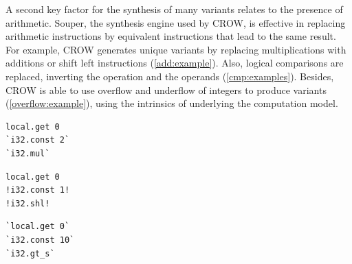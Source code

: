 A second key factor for the synthesis of many variants relates to the presence of arithmetic. Souper, the synthesis engine used by CROW, is effective in replacing  arithmetic instructions by equivalent instructions that lead to the same result. For example, CROW generates unique variants by replacing multiplications with additions or shift left instructions (\autoref{add:example}). Also, logical comparisons are replaced, inverting the operation and the operands (\autoref{cmp:examples}). Besides, CROW is able to use overflow and underflow of integers to produce variants (\autoref{overflow:example}), using the intrinsics of underlying the computation model.

{
\begin{code}
    \footnotesize

    \lstset{
        language=WAT,
        style=nccode,
        basicstyle=\footnotesize\ttfamily,
        columns=fullflexible,
        breaklines=true
    }
    \noindent\begin{minipage}[b]{0.32\linewidth}
        \label{add:example}
        \noindent\begin{minipage}[t]{0.46\linewidth}
            \begin{lstlisting}
local.get 0
`i32.const 2`
`i32.mul`
            \end{lstlisting}
        \end{minipage}%
        \hfill\noindent\begin{minipage}[t]{0.46\linewidth}
            
            \begin{lstlisting}
local.get 0
!i32.const 1!
!i32.shl!
            \end{lstlisting}
        \end{minipage}
    \end{minipage}\hfill%
    \begin{minipage}[b]{0.31\linewidth}
        \label{cmp:examples}
        \begin{minipage}[t]{.46\linewidth}
            \begin{lstlisting}
`local.get 0`
`i32.const 10`
`i32.gt_s`
            \end{lstlisting}
        \end{minipage}\hfill\begin{minipage}[t]{.46\linewidth}
           

\end{minipage}
\end{minipage}
\end{code}}
